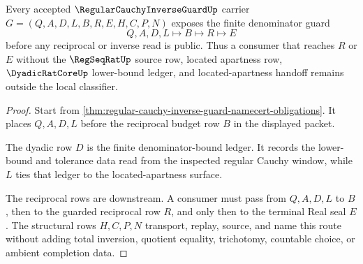 \begin{theorem}
\label{thm:regular-cauchy-inverse-guard-finite-denominator-bound}
Every accepted $\RegularCauchyInverseGuardUp$ carrier $G=(Q,A,D,L,B,R,E,H,C,P,N)$ exposes the finite denominator guard
$$
Q,A,D,L \longmapsto B \longmapsto R \longmapsto E
$$
before any reciprocal or inverse read is public. Thus a consumer that reaches $R$ or $E$ without the $\RegSeqRatUp$ source row, located apartness row, $\DyadicRatCoreUp$ lower-bound ledger, and located-apartness handoff remains outside the local classifier.
\end{theorem}
\begin{proof}
Start from \autoref{thm:regular-cauchy-inverse-guard-namecert-obligations}. It places $Q,A,D,L$ before the reciprocal budget row $B$ in the displayed packet.

The dyadic row $D$ is the finite denominator-bound ledger. It records the lower-bound and tolerance data read from the inspected regular Cauchy window, while $L$ ties that ledger to the located-apartness surface.

The reciprocal rows are downstream. A consumer must pass from $Q,A,D,L$ to $B$, then to the guarded reciprocal row $R$, and only then to the terminal Real seal $E$. The structural rows $H,C,P,N$ transport, replay, source, and name this route without adding total inversion, quotient equality, trichotomy, countable choice, or ambient completion data.
\end{proof}


